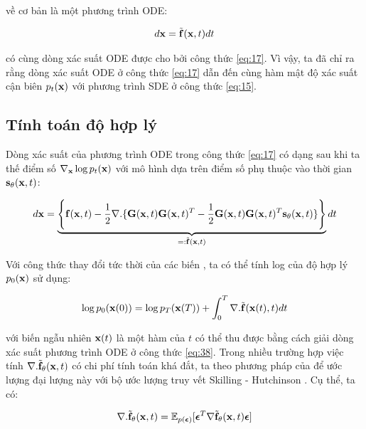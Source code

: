 \documentclass{article} %
\begin{document}
về cơ bản là một phương trình ODE:

\begin{equation*}
    d \bold{x} = \tilde{\bold{f}}(\bold{x}, t) dt
\end{equation*}

có cùng dòng xác suất ODE được cho bởi công thức \ref{eq:17}.
Vì vậy, ta đã chỉ ra rằng dòng xác suất ODE ở công thức \ref{eq:17} dẫn đến cùng hàm mật độ xác suất cận biên $p_t(\bold{x})$ với phương trình SDE ở công thức \ref{eq:15}.

\subsection{Tính toán độ hợp lý}

Dòng xác suất của phương trình ODE trong công thức \ref{eq:17} có dạng sau khi ta thế điểm số $\nabla_{\bold{x}} \log p_t (\bold{x})$ với mô hình dựa trên điểm số phụ thuộc vào thời gian $\bold{s}_{\bold{\theta}}(\bold{x}, t)$:

\begin{equation} \label{eq:38}
    d \bold{x} = \underbrace{\Bigg \lbrace \bold{f}(\bold{x}, t) - \dfrac{1}{2} \nabla . \lbrace \bold{G}(\bold{x}, t) \bold{G}(\bold{x}, t)^T - \dfrac{1}{2} \bold{G}(\bold{x}, t) \bold{G}(\bold{x}, t)^T \bold{s}_{\bold{\theta}} (\bold{x}, t) \rbrace \Bigg \rbrace}_{=: \tilde{\bold{f}}(\bold{x}, t)} dt
\end{equation}

Với công thức thay đổi tức thời của các biến \citep{chen2018neural}, ta có thể tính log của độ hợp lý $p_0 (\bold{x})$ sử dụng:

\begin{equation} \label{eq:39}
    \log p_0 (\bold{x}(0)) = \log p_T (\bold{x}(T)) + \int_{0}^{T} \nabla . \tilde{\bold{f}}(\bold{x}(t), t) dt
\end{equation}

với biến ngẫu nhiên $\bold{x}(t)$ là một hàm của $t$ có thể thu được bằng cách giải dòng xác suất phương trình ODE ở công thức \ref{eq:38}.
Trong nhiều trường hợp việc tính $\nabla . \tilde{\bold{f}}_{\bold{\theta}}(\bold{x}, t)$ có chi phí tính toán khá đắt, ta theo phương pháp của \citep{grathwohl2018ffjord} để ước lượng đại lượng này với bộ ước lượng truy vết Skilling - Hutchinson \citep{skilling1989eigenvalues,hutchinson1989stochastic}.
Cụ thể, ta có:

\begin{equation} \label{eq:40}
    \nabla . \tilde{\bold{f}}_{\bold{\theta}}(\bold{x}, t) = \mathbb{E}_{p(\boldsymbol{\epsilon})} \lbrack \boldsymbol{\epsilon}^T \nabla \tilde{\bold{f}}_{\bold{\theta}} (\bold{x}, t) \boldsymbol{\epsilon} \rbrack
\end{equation}
\end{document}
